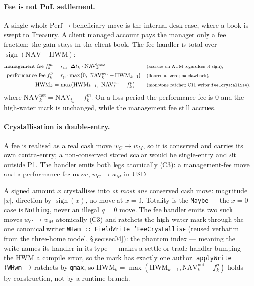 \paragraph{Fee is not PnL settlement.} A single whole-$\mathrm{Perf}\to$beneficiary move is the
internal-desk case, where a book is swept to Treasury. A client managed account pays the manager
only a fee fraction; the gain stays in the client book. The fee handler is total over
$\operatorname{sign}(\mathrm{NAV}-\mathrm{HWM})$:
{\small\begin{align*}
\text{management fee } f^{m}_k &= r_{\text{m}}\cdot\Delta t_k\cdot \mathrm{NAV}^{\text{base}}_k
&&\text{\footnotesize(accrues on AUM regardless of sign),}\\
\text{performance fee } f^{p}_k &= r_{\text{p}}\cdot\max\!\big(0,\ \mathrm{NAV}^{\text{net}}_k-\mathrm{HWM}_{k-1}\big)
&&\text{\footnotesize(floored at zero; no clawback),}\\
\mathrm{HWM}_k &= \max\!\big(\mathrm{HWM}_{k-1},\ \mathrm{NAV}^{\text{net}}_k-f^{p}_k\big)
&&\text{\footnotesize(monotone ratchet; C11 writer \texttt{fee\_crystallise}),}
\end{align*}}
where $\mathrm{NAV}^{\text{net}}_k=\mathrm{NAV}_{t_k}-f^{m}_k$. On a loss period the performance
fee is $0$ and the high-water mark is unchanged, while the management fee still accrues.

\paragraph{Crystallisation is double-entry.} A fee is realised as a real cash move
$w_C\to w_M$, so it is conserved and carries its own contra-entry; a non-conserved stored scalar
would be single-entry and sit outside P1. The handler emits both legs atomically (C3): a
management-fee move and a performance-fee move, $w_C\to w_M$ in USD.

A signed amount $x$ crystallises into \emph{at most one} conserved cash move:
magnitude $|x|$, direction by $\operatorname{sign}(x)$, no move at $x=0$. Totality is the
\texttt{Maybe} --- the $x=0$ case is \texttt{Nothing}, never an illegal $q=0$ move. The fee
handler emits two such moves $w_C\to w_M$ atomically (C3) and ratchets the high-water mark
through the one canonical writer \texttt{WHwm :: FieldWrite 'FeeCrystallise} (reused verbatim
from the three-home model, \S\ref{sec:sec04}): the phantom index --- meaning the write names
its handler in its type --- makes a settle or trade handler bumping the HWM a compile error, so
the mark has exactly one author. \texttt{applyWrite (WHwm \_)} ratchets by \texttt{qmax}, so
$\mathrm{HWM}_k=\max(\mathrm{HWM}_{k-1},\mathrm{NAV}^{\text{net}}_k-f^p_k)$ holds by
construction, not by a runtime branch.

